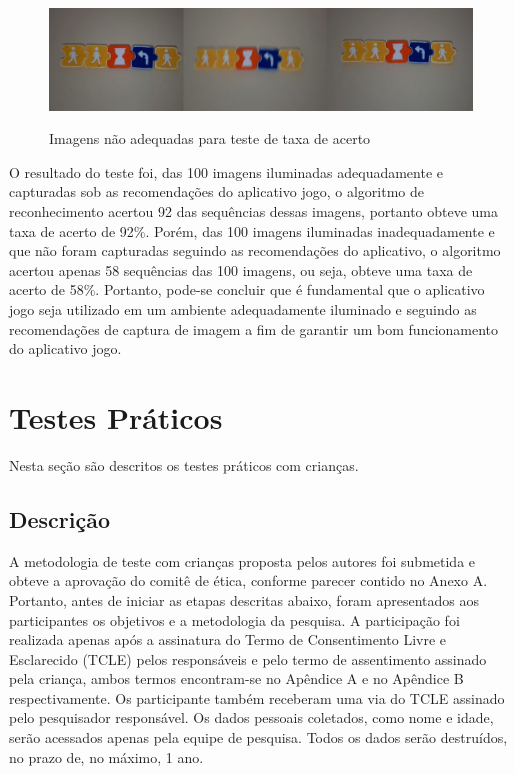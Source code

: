 \begin{figure}[H]
    \caption{Imagens não adequadas para teste de taxa de acerto}
    \centering
    \includegraphics[width=15cm]{Imagens/Cap5/tta_ruim.PNG}
    \label{figura:tta_ruim}
\end{figure}

O resultado do teste foi, das 100 imagens iluminadas adequadamente e capturadas sob as recomendações do aplicativo jogo, o algoritmo de reconhecimento acertou 92 das sequências dessas imagens, portanto obteve uma taxa de acerto de 92\%. Porém, das 100 imagens iluminadas inadequadamente e que não foram capturadas seguindo as recomendações do aplicativo, o algoritmo acertou apenas 58 sequências das 100 imagens, ou seja, obteve uma taxa de acerto de 58\%. Portanto, pode-se concluir que é fundamental que o aplicativo jogo seja utilizado em um ambiente adequadamente iluminado e seguindo as recomendações de captura de imagem a fim de garantir um bom funcionamento do aplicativo jogo.


\section{Testes Práticos}

Nesta seção são descritos os testes práticos com crianças.

\subsection{\textbf{Descrição}}


A metodologia de teste com crianças proposta pelos autores foi submetida e obteve a aprovação do comitê de ética, conforme parecer contido no Anexo A. Portanto, antes de iniciar as etapas descritas abaixo, foram apresentados aos participantes os objetivos e a metodologia da pesquisa. A participação foi  realizada apenas após a assinatura do Termo de Consentimento Livre e Esclarecido (TCLE) pelos responsáveis e pelo termo de assentimento assinado pela criança, ambos termos encontram-se no Apêndice A e no Apêndice B respectivamente. Os participante também receberam uma via do TCLE assinado pelo pesquisador responsável. Os dados pessoais coletados, como nome e idade, serão acessados apenas pela equipe de pesquisa. Todos os dados serão destruídos, no prazo de, no máximo, 1 ano.

